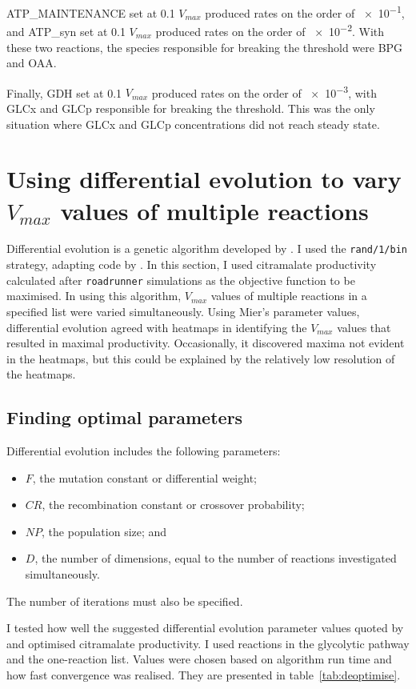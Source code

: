 \documentclass[parskip=full, numbers=noenddot]{scrreprt}
\begin{document}
ATP\_MAINTENANCE set at 0.1 $V_{max}$ produced rates on the order of \num{e-1}, and ATP\_syn set at 0.1 $V_{max}$ produced rates on the order of \num{e-2}. With these two reactions, the species responsible for breaking the threshold were BPG and OAA.

Finally, GDH set at 0.1 $V_{max}$ produced rates on the order of \num{e-3}, with GLCx and GLCp responsible for breaking the threshold. This was the only situation where GLCx and GLCp concentrations did not reach steady state.

\section{Using differential evolution to vary $V_{max}$ values of multiple reactions}
\label{sec:de}

Differential evolution is a genetic algorithm developed by \citet{storn_differential_1997}. I used the \texttt{rand/1/bin} strategy, adapting code by \citet{mier_tutorial_2017, mier_small_2017}.
In this section, I used citramalate productivity calculated after \texttt{roadrunner} simulations as the objective function to be maximised. In using this algorithm, $V_{max}$ values of multiple reactions in a specified list were varied simultaneously. Using Mier's parameter values, differential evolution agreed with heatmaps in identifying the $V_{max}$ values that resulted in maximal productivity. Occasionally, it discovered maxima not evident in the heatmaps, but this could be explained by the relatively low resolution of the heatmaps. 

\subsection{Finding optimal parameters}
\label{ssec:deoptimise}

Differential evolution includes the following parameters:
\begin{itemize}
\item $F$, the mutation constant or differential weight;
\item $CR$, the recombination constant or crossover probability;
\item $NP$, the population size; and
  \item $D$, the number of dimensions, equal to the number of reactions investigated simultaneously.
\end{itemize}
The number of iterations must also be specified.

I tested how well the suggested differential evolution parameter values quoted by \citet{storn_usage_1996} and \citet{pedersen_good_2010} optimised citramalate productivity. I used reactions in the glycolytic pathway and the one-reaction list. Values were chosen based on algorithm run time and how fast convergence was realised. They are presented in table~\ref{tab:deoptimise}.
\end{document}
